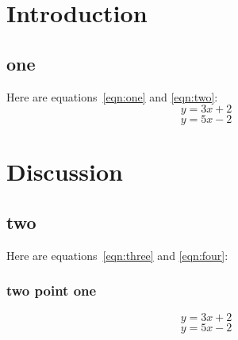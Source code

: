 \documentclass[11pt]{book}
\begin{document}
\chapter{Introduction}

\section{one}
Here are equations~\ref{eqn:one} and \ref{eqn:two}:
\begin{equation}
\label{eqn:one}y = 3x+2
\end{equation}
\begin{equation}
\label{eqn:two}y = 5x-2
\end{equation}

\chapter{Discussion}
\section{two}
Here are equations~\ref{eqn:three} and \ref{eqn:four}:
\subsection{two point one}
\begin{equation}
\label{eqn:three}y = 3x+2
\end{equation}
\begin{equation}
\label{eqn:four}y = 5x-2
\end{equation}
\end{document}
